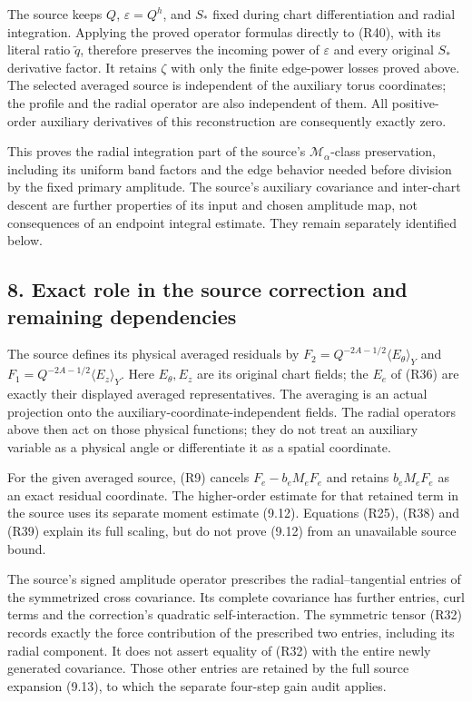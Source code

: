 \documentclass[10pt,a4paper]{article}
\begin{document}
The source keeps \(Q\), \(\varepsilon=Q^h\), and \(S_*\) fixed during chart differentiation and radial integration. Applying the proved operator formulas directly to (R40), with its literal ratio \(\widetilde q\), therefore preserves the incoming power of \(\varepsilon\) and every original \(S_*\) derivative factor. It retains \(\zeta\) with only the finite edge-power losses proved above. The selected averaged source is independent of the auxiliary torus coordinates; the profile and the radial operator are also independent of them. All positive-order auxiliary derivatives of this reconstruction are consequently exactly zero.

This proves the radial integration part of the source's \(\mathcal M_\alpha\)-class preservation, including its uniform band factors and the edge behavior needed before division by the fixed primary amplitude. The source's auxiliary covariance and inter-chart descent are further properties of its input and chosen amplitude map, not consequences of an endpoint integral estimate. They remain separately identified below.

\subsection{8. Exact role in the source correction and remaining dependencies}\label{nsupstream:radial_stress_reconstruction_audit:exact-role-in-the-source-correction-and-remaining-dependencies}

The source defines its physical averaged residuals by \(F_2=Q^{-2A-1/2}\langle E_\theta\rangle_Y\) and \(F_1=Q^{-2A-1/2}\langle E_z\rangle_Y\). Here \(E_\theta,E_z\) are its original chart fields; the \(E_e\) of (R36) are exactly their displayed averaged representatives. The averaging is an actual projection onto the auxiliary-coordinate-independent fields. The radial operators above then act on those physical functions; they do not treat an auxiliary variable as a physical angle or differentiate it as a spatial coordinate.

For the given averaged source, (R9) cancels \(F_e-b_eM_eF_e\) and retains \(b_eM_eF_e\) as an exact residual coordinate. The higher-order estimate for that retained term in the source uses its separate moment estimate (9.12). Equations (R25), (R38) and (R39) explain its full scaling, but do not prove (9.12) from an unavailable source bound.

The source's signed amplitude operator prescribes the radial--tangential entries of the symmetrized cross covariance. Its complete covariance has further entries, curl terms and the correction's quadratic self-interaction. The symmetric tensor (R32) records exactly the force contribution of the prescribed two entries, including its radial component. It does not assert equality of (R32) with the entire newly generated covariance. Those other entries are retained by the full source expansion (9.13), to which the separate four-step gain audit applies.
\end{document}
